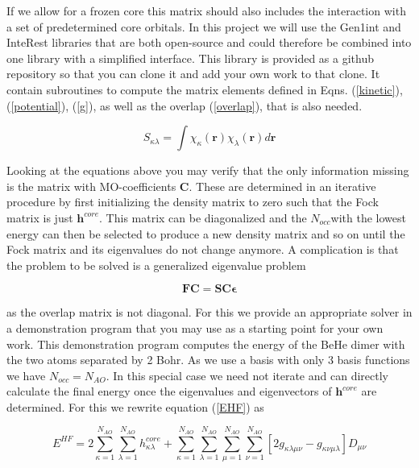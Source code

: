 \documentclass[11pt, bibliography=totoc]{scrartcl}
\begin{document}
If we allow for a frozen core this matrix should also includes the interaction with a set of predetermined core orbitals. In this project we will use the Gen1int and InteRest libraries that are both open-source and could therefore be combined into one library with a simplified interface. This library is provided as a github repository so that you can clone it and add your own work to that clone. It contain subroutines to compute the matrix elements defined in Eqns. (\ref{kinetic}), (\ref{potential}), (\ref{g}), as well as the overlap (\ref{overlap}), that is also needed. 

\begin{equation} \label{overlap}
S_{\kappa \lambda}= \int \chi_\kappa(\mathbf{r}) \chi_\lambda(\mathbf{r})  d\mathbf{r}
\end{equation}

Looking at the equations above you may verify that the only information missing is the matrix with MO-coefficients $\mathbf{C}$. These are determined in an iterative procedure by first initializing the density matrix to zero such that the Fock matrix is just $\mathbf{h}^{core}$. This matrix can be diagonalized and the $N_{occ}$with the lowest energy can then be selected to produce a new density matrix and so on until the Fock matrix and its eigenvalues do not change anymore. A complication is that the problem to be solved is a generalized eigenvalue problem

\begin{equation} \label{fm_diag}
\mathbf{F}\mathbf{C}=\mathbf{S}\mathbf{C}\mathbf{\epsilon}
\end{equation}

as the overlap matrix is not diagonal. For this we provide an appropriate solver in a demonstration program that you may use as a starting point for your own work. This demonstration program computes the energy of the BeHe dimer with the two atoms separated by 2 Bohr. As we use a basis with only 3 basis functions we have $N_{occ}= N_{AO}$. In this special case we need not iterate and can directly calculate the final energy once the eigenvalues and eigenvectors of $\mathbf{h}^{core}$ are determined. For this we rewrite equation (\ref{EHF}) as

\begin{equation} \label{EHF_start}
E^{HF}= 2 \sum_{\kappa=1}^{N_{AO}} \sum_{\lambda=1}^{N_{AO}}  h^{core}_{\kappa \lambda} + \sum_{\kappa=1}^{N_{AO}} \sum_{\lambda=1}^{N_{AO}} \sum_{\mu=1}^{N_{AO}} \sum_{\nu=1}^{N_{AO}} \left[ 2g_{\kappa \lambda \mu \nu} - g_{\kappa \nu \mu \lambda}\right] D_{\mu \nu}
\end{equation}
\end{document}
